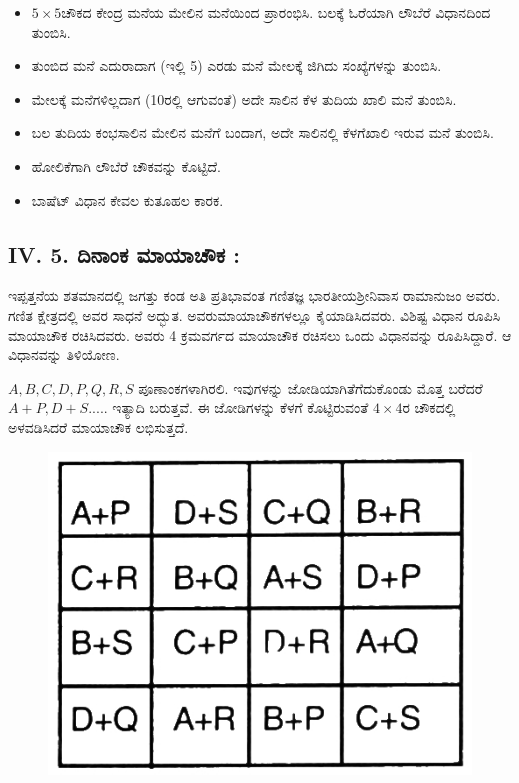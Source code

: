 \begin{itemize}
	\item $5 \times 5$ಚೌಕದ ಕೇಂದ್ರ ಮನೆಯ ಮೇಲಿನ ಮನೆಯಿಂದ ಪ್ರಾರಂಭಿಸಿ. ಬಲಕ್ಕೆ ಓರೆಯಾಗಿ ಲೌಬೆರೆ ವಿಧಾನದಿಂದ ತುಂಬಿಸಿ.
	\item ತುಂಬಿದ ಮನೆ ಎದುರಾದಾಗ (ಇಲ್ಲಿ 5) ಎರಡು ಮನೆ ಮೇಲಕ್ಕೆ ಜಿಗಿದು ಸಂಖ್ಯೆ\-ಗಳನ್ನು ತುಂಬಿಸಿ.
	\item ಮೇಲಕ್ಕೆ ಮನೆಗಳಿಲ್ಲದಾಗ (10ರಲ್ಲಿ ಆಗುವಂತೆ) ಅದೇ ಸಾಲಿನ ಕೆಳ ತುದಿಯ ಖಾಲಿ ಮನೆ ತುಂಬಿಸಿ.
	\item ಬಲ ತುದಿಯ ಕಂಭಸಾಲಿನ ಮೇಲಿನ ಮನೆಗೆ ಬಂದಾಗ, ಅದೇ ಸಾಲಿನಲ್ಲಿ ಕೆಳಗೆ\break ಖಾಲಿ ಇರುವ ಮನೆ ತುಂಬಿಸಿ.
	\item ಹೋಲಿಕೆಗಾಗಿ ಲೌಬೆರೆ ಚೌಕವನ್ನು ಕೊಟ್ಟಿದೆ.
	\item ಬಾಷೆಟ್ ವಿಧಾನ ಕೇವಲ ಕುತೂಹಲ ಕಾರಕ.
\end{itemize}

\subsection*{IV. 5. ದಿನಾಂಕ ಮಾಯಾಚೌಕ :}

ಇಪ್ಪತ್ತನೆಯ ಶತಮಾನದಲ್ಲಿ ಜಗತ್ತು ಕಂಡ ಅತಿ ಪ್ರತಿಭಾವಂತ ಗಣಿತಜ್ಞ ಭಾರತೀಯ\break ಶ್ರೀನಿವಾಸ ರಾಮಾನುಜಂ ಅವರು. ಗಣಿತ ಕ್ಷೇತ್ರದಲ್ಲಿ ಅವರ ಸಾಧನೆ ಅದ್ಭುತ. ಅವರು\break ಮಾಯಾಚೌಕಗಳಲ್ಲೂ ಕೈಯಾಡಿಸಿದವರು. ವಿಶಿಷ್ಟ ವಿಧಾನ ರೂಪಿಸಿ ಮಾಯಾಚೌಕ ರಚಿಸಿದವರು. ಅವರು 4 ಕ್ರಮವರ್ಗದ ಮಾಯಾಚೌಕ ರಚಿಸಲು ಒಂದು ವಿಧಾನವನ್ನು ರೂಪಿಸಿ\-ದ್ದಾರೆ. ಆ ವಿಧಾನವನ್ನು ತಿಳಿಯೋಣ.

$A, B, C, D, P, Q, R, S$ ಪೂಣಾಂಕಗಳಾಗಿರಲಿ. ಇವುಗಳನ್ನು ಜೋಡಿಯಾಗಿ\break ತೆಗೆದುಕೊಂಡು ಮೊತ್ತ ಬರೆದರೆ $A+P, D+S.....$ ಇತ್ಯಾದಿ ಬರುತ್ತವೆ. ಈ ಜೋಡಿಗಳನ್ನು ಕೆಳಗೆ ಕೊಟ್ಟಿರುವಂತೆ $4 \times 4$ರ ಚೌಕದಲ್ಲಿ ಅಳವಡಿಸಿದರೆ ಮಾಯಾಚೌಕ ಲಭಿಸುತ್ತದೆ.
\begin{figure}[h]
\includegraphics[scale=.9]{src/figures/chap3/fig3.44.jpg}
\end{figure}

